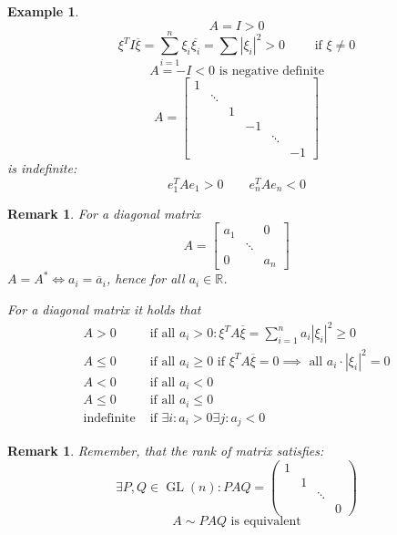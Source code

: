 \documentclass{article}
\newcounter{lecref}[section]
\numberwithin{lecref}{section}
\newtheorem{example}[lecref]{Example}
\newtheorem{remark}[lecref]{Remark}
\newcommand{\card}[1]{\left|#1\right|}
\begin{document}
\begin{example}
  \[ A = I > 0 \]
  \[ \xi^T I \overline{\xi} = \sum_{i=1}^n \xi_i \overline{\xi_i} = \sum \card{\xi_i}^2 > 0 \qquad \text{ if } \xi \neq 0 \]
  \[ A = -I < 0 \text{ is negative definite} \]
  \[
    A = \begin{bmatrix}
      1 &        &   &    &        & \\
        & \ddots &   &    &        & \\
        &        & 1 &    &        & \\
        &        &   & -1 &        & \\
        &        &   &    & \ddots & \\
        &        &   &    &        & -1
    \end{bmatrix}
  \]
  is indefinite:
  \[ e_1^T A e_1 > 0 \qquad e_n^T A e_n < 0 \]
\end{example}

\begin{remark}
  For a diagonal matrix
  \[ A = \begin{bmatrix} a_1 &  & 0 \\ & \ddots & \\ 0 &  & a_n \end{bmatrix} \]
  $A = A^* \iff a_i = \overline{a}_i$, hence for all $a_i \in \mathbb R$.

  For a diagonal matrix it holds that
  \begin{align*}
    A > 0 & \text{ if all } a_i > 0: \xi^T A \overline{\xi} = \sum_{i=1}^n a_i \card{\xi_i}^2 \geq 0 \\
    A \leq 0 & \text{ if all } a_i \geq 0 \text{ if } \xi^T A \overline{\xi} = 0 \implies \text{ all } a_i \cdot \card{\xi_i}^2 = 0 \\
    A < 0 & \text{ if all } a_i < 0 \\
    A \leq 0 & \text{ if all } a_i \leq 0 \\
    \text{indefinite} & \text{ if } \exists i: a_i > 0 \exists j: a_j < 0
  \end{align*}
\end{remark}

\begin{remark}
  Remember, that the rank of matrix satisfies:
  \[ \exists P,Q \in \operatorname{GL}(n): PAQ = \begin{pmatrix} 1 & & & \\ & 1 & & \\ & & \ddots & \\ & & & 0 \end{pmatrix} \]
  \[ A \sim PAQ \text{ is equivalent} \]
\end{remark}
\end{document}
